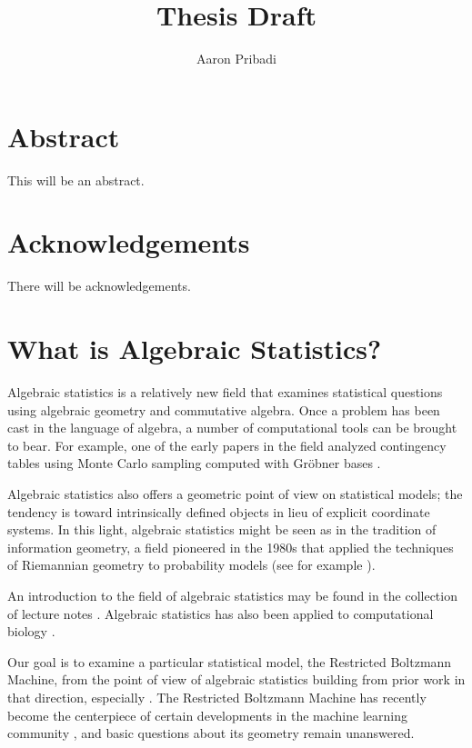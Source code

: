 \documentclass[cclicense]{hmcthesis}
\title{Thesis Draft}
\author{Aaron Pribadi}
\numberwithin{equation}{section}
\begin{document}
\frontmatter

\maketitle

\tableofcontents


\chapter{Abstract}
    This will be an abstract.

\chapter{Acknowledgements}
    There will be acknowledgements.

\mainmatter

\chapter{What is Algebraic Statistics?}

    Algebraic statistics is a relatively new field that examines statistical
    questions using algebraic geometry and commutative algebra.  Once a problem
    has been cast in the language of algebra, a number of computational tools
    can be brought to bear.  For example, one of the early papers in the field
    analyzed contingency tables using Monte Carlo sampling computed with Gröbner
    bases \citep{DS98}.

    Algebraic statistics also offers a geometric point of view on statistical
    models; the tendency is toward intrinsically defined objects in lieu of
    explicit coordinate systems.  In this light, algebraic statistics might be
    seen as in the tradition of information geometry, a field pioneered in the
    1980s that applied the techniques of Riemannian geometry to probability
    models (see for example \citep{Ama}).

    An introduction to the field of algebraic statistics may be found in the
    collection of lecture notes \citep{DSS08}.  Algebraic statistics has also
    been applied to computational biology \citep{ASCB}.

    Our goal is to examine a particular statistical model, the Restricted
    Boltzmann Machine, from the point of view of algebraic statistics building
    from prior work in that direction, especially \citep{CMS09}.  The Restricted
    Boltzmann Machine has recently become the centerpiece of certain
    developments in the machine learning community \citep{Hin07}, and basic
    questions about its geometry remain unanswered.  
    
\end{document}
